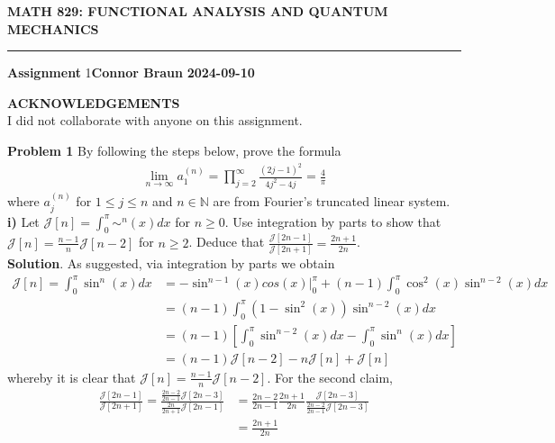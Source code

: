 \documentclass[10pt]{article}
\newcommand{\mbb}[1]{\mathbb{#1}}
\newcommand{\1}[1]{\mathbbm{1}_{#1}}
\newcommand{\mc}[1]{\mathcal{#1}}
\begin{document}
    \begin{center}
        {\bf\large{MATH 829: FUNCTIONAL ANALYSIS AND QUANTUM MECHANICS}}
        \smallskip
        \hrule
        \smallskip
        {\bf Assignment} 1\hfill {\bf Connor Braun} \hfill {\bf 2024-09-10}
    \end{center}

    \begin{center}
        \begin{minipage}{\dimexpr\paperwidth-10cm}
            {\bf ACKNOWLEDGEMENTS}\\[5pt]
            I did not collaborate with anyone on this assignment.
        \end{minipage}
    \end{center}
    \vspace{5pt}
    {\bf Problem 1} By following the steps below, prove the formula
    \begin{align}
        \lim_{n\rightarrow\infty}a_1^{(n)}=\prod_{j=2}^\infty\frac{(2j-1)^2}{4j^2-4j}=\frac{4}{\pi}\label{eq1}
    \end{align}
    where $a^{(n)}_j$ for $1\leq j\leq n$ and $n\in\mbb{N}$ are from Fourier's truncated linear system.\\[5pt]
    {\bf i)} Let $\mc{J}[n]=\int_0^\pi\sim^n(x)dx$ for $n\geq 0$. Use integration by parts to show that $\mc{J}[n]=\frac{n-1}{n}\mc{J}[n-2]$
    for $n\geq 2$. Deduce that $\tfrac{\mc{J}[2n-1]}{\mc{J}[2n+1]}=\tfrac{2n+1}{2n}$.\\[5pt]
    {\bf Solution}. As suggested, via integration by parts we obtain
    \begin{align*}
        \mc{J}[n]=\int_0^\pi\sin^n(x)dx&=-\sin^{n-1}(x)cos(x)\bigg|^\pi_0+(n-1)\int_0^\pi\cos^2(x)\sin^{n-2}(x)dx\\
        &=(n-1)\int_0^\pi(1-\sin^2(x))\sin^{n-2}(x)dx\\
        &=(n-1)\left[\int_0^\pi\sin^{n-2}(x)dx-\int_0^\pi\sin^n(x)dx\right]\\
        &=(n-1)\mc{J}[n-2]-n\mc{J}[n]+\mc{J}[n]
    \end{align*}
    whereby it is clear that $\mc{J}[n]=\tfrac{n-1}{n}\mc{J}[n-2]$. For the second claim,
    \begin{align*}
        \frac{\mc{J}[2n-1]}{\mc{J}[2n+1]}=\frac{\tfrac{2n-2}{2n-1}\mc{J}[2n-3]}{\tfrac{2n}{2n+1}\mc{J}[2n-1]}&=\frac{2n-2}{2n-1}\frac{2n+1}{2n}\frac{\mc{J}[2n-3]}{\tfrac{2n-2}{2n-1}\mc{J}[2n-3]}\\
        &=\frac{2n+1}{2n}
    \end{align*}
\end{document}
